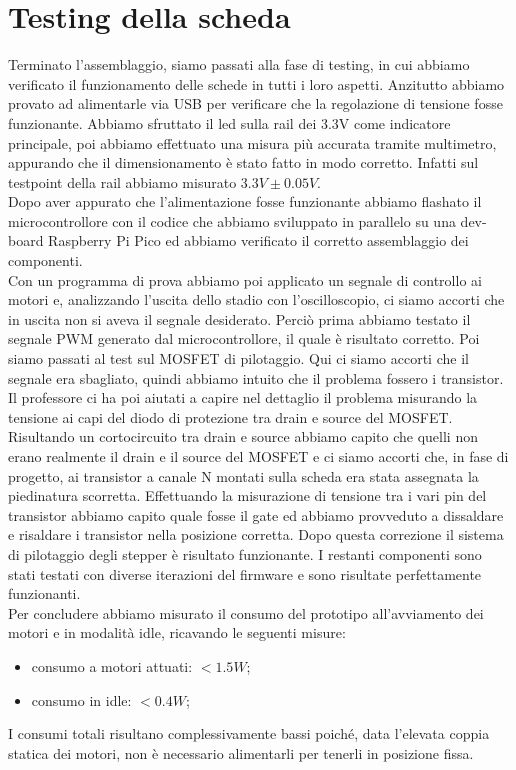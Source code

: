 \chapter{Testing della scheda}

Terminato l’assemblaggio, siamo passati alla fase di testing, in cui abbiamo verificato il funzionamento delle schede in tutti i loro aspetti.
Anzitutto abbiamo provato ad alimentarle via USB per verificare che la regolazione di tensione fosse funzionante. Abbiamo sfruttato il led sulla rail dei 3.3V come indicatore principale, poi abbiamo effettuato una misura più accurata tramite multimetro, appurando che il dimensionamento è stato fatto in modo corretto. Infatti sul testpoint della rail abbiamo misurato $3.3V \pm 0.05V$. \\
Dopo aver appurato che l’alimentazione fosse funzionante abbiamo flashato il microcontrollore con il codice che abbiamo sviluppato in parallelo su una dev-board Raspberry Pi Pico ed abbiamo verificato il corretto assemblaggio dei componenti. \\
Con un programma di prova abbiamo poi applicato un segnale di controllo ai motori e, analizzando l’uscita dello stadio con l’oscilloscopio, ci siamo accorti che in uscita non si aveva il segnale desiderato. Perciò prima abbiamo testato il segnale PWM generato dal microcontrollore, il quale è risultato corretto. Poi siamo passati al test sul MOSFET di pilotaggio. Qui ci siamo accorti che il segnale era sbagliato, quindi abbiamo intuito che il problema fossero i transistor. Il professore ci ha poi aiutati a capire nel dettaglio il problema misurando la tensione ai capi del diodo di protezione tra drain e source del MOSFET. Risultando un cortocircuito tra drain e source abbiamo capito che quelli non erano realmente il drain e il source del MOSFET e ci siamo accorti che, in fase di progetto, ai transistor a canale N montati sulla scheda era stata assegnata la piedinatura scorretta. Effettuando la misurazione di tensione tra i vari pin del transistor abbiamo capito quale fosse il gate ed abbiamo provveduto a dissaldare e risaldare i transistor nella posizione corretta. Dopo questa correzione il sistema di pilotaggio degli stepper è risultato funzionante.
I restanti componenti sono stati testati con diverse iterazioni del firmware e sono risultate perfettamente funzionanti. \\
Per concludere abbiamo misurato il consumo del prototipo all’avviamento dei motori e in modalità idle,  ricavando le seguenti misure:

\begin{itemize}
    \item consumo a motori attuati: $<1.5 W$;
    \item consumo in idle: $<0.4 W$;
\end{itemize}
I consumi totali risultano complessivamente bassi poiché, data l'elevata coppia statica dei motori, non è necessario alimentarli per tenerli in posizione fissa.

